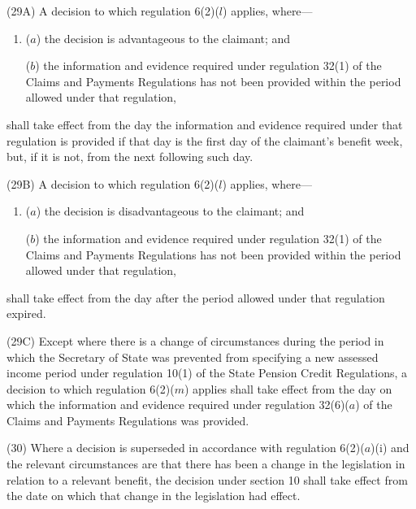 \documentclass[12pt,a4paper]{article}
\begin{document}
(29A) A decision to which regulation 6(2)($l$)  applies, where—
\begin{enumerate}\item[]
($a$) the decision is advantageous to the claimant; and

($b$) the information and evidence required under regulation 32(1) of the Claims and Payments Regulations has not been provided within the period allowed under that regulation,
\end{enumerate}
shall take effect from the day the information and evidence required under that regulation is provided if that day is the first day of the claimant’s benefit week, but, if it is not, from the next following such day.

(29B) A decision to which regulation 6(2)($l$)  applies, where—
\begin{enumerate}\item[]
($a$) the decision is disadvantageous to the claimant; and

($b$) the information and evidence required under regulation 32(1) of the Claims and Payments Regulations has not been provided within the period allowed under that regulation,
\end{enumerate}
shall take effect from the day after the period allowed under that regulation expired.

(29C) Except where there is a change of circumstances during the period in which the Secretary of State was prevented from specifying a new assessed income period under regulation 10(1) of the State Pension Credit Regulations, a decision to which regulation 6(2)($m$)  applies shall take effect from the day on which the information and evidence required under regulation 32(6)($a$)  of the Claims and Payments Regulations was provided.

\begin{sloppypar}
(30) Where a decision is superseded in accordance with regulation 6(2)($a$)(i)  and the relevant circumstances are that there has been a change in the legislation in relation to a relevant benefit, the decision under section 10 shall take effect from the date on which that change in the legislation had effect.
\end{sloppypar}
\end{document}
